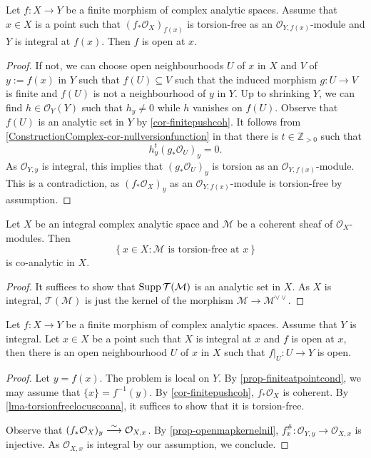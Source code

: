 \begin{corollary}
    Let $f:X\rightarrow Y$ be a finite morphism of complex analytic spaces. Assume that $x\in X$ is a point such that $(f_*\mathcal{O}_X)_{f(x)}$ is torsion-free as an $\mathcal{O}_{Y,f(x)}$-module and $Y$ is integral at $f(x)$. Then $f$ is open at $x$.
\end{corollary}
\begin{proof}
    If not, we can choose open neighbourhoods $U$ of $x$ in $X$ and $V$ of $y:=f(x)$ in $Y$ such that $f(U)\subseteq V$ such that the induced morphism $g:U\rightarrow V$ is finite and $f(U)$ is not a neighbourhood of $y$ in $Y$. 
    Up to shrinking $Y$, we can find $h\in \mathcal{O}_Y(Y)$ such that $h_y\neq 0$ while $h$ vanishes on $f(U)$. 
     Observe that $f(U)$ is an analytic set in $Y$ by  \cref{cor-finitepushcoh}. It follows from \cref{ConstructionComplex-cor-nullversionfunction} in  that there is $t\in \mathbb{Z}_{>0}$ such that
     \[
        h_y^t (g_*\mathcal{O}_U)_y=0.   
     \]
     As $\mathcal{O}_{Y,y}$ is integral, this implies that $(g_*\mathcal{O}_U)_y$ is torsion as an $\mathcal{O}_{Y,f(x)}$-module. This is a contradiction, as $(f_*\mathcal{O}_X)_y$ as an $\mathcal{O}_{Y,f(x)}$-module is torsion-free by assumption.
\end{proof} 

\begin{lemma}\label{lma-torsionfreelocuscoana}
    Let $X$ be an integral complex analytic space and $\mathcal{M}$ be a coherent sheaf of $\mathcal{O}_X$-modules. Then
    \[
        \left\{x\in X: \mathcal{M}\text{ is torsion-free at }x \right\}
    \]
    is co-analytic in $X$.
\end{lemma}
\begin{proof}
    It suffices to show that $\operatorname{Supp} \mathcal{T}(\mathcal{M})$ is an analytic set in $X$. As $X$ is integral, $\mathcal{T}(\mathcal{M})$ is just the kernel of the morphism $\mathcal{M}\rightarrow \mathcal{M}^{\vee\vee}$.
\end{proof}

\begin{corollary}
    Let $f:X\rightarrow Y$ be a finite morphism of complex analytic spaces. Assume that $Y$ is integral. Let $x\in X$ be a point such that $X$ is integral at $x$ and $f$ is open at $x$, then there is an open neighbourhood $U$ of $x$ in $X$ such that $f|_U:U\rightarrow Y$ is open.
\end{corollary}
\begin{proof}
    Let $y=f(x)$.
    The problem is local on $Y$.
    By \cref{prop-finiteatpointcond}, we may assume that $\{x\}=f^{-1}(y)$. By \cref{cor-finitepushcoh}, $f_*\mathcal{O}_X$ is coherent. By \cref{lma-torsionfreelocuscoana}, it suffices to show that it is torsion-free.
    
    Observe that $(f_*\mathcal{O}_{X})_y\stackrel{\sim}{\longrightarrow} \mathcal{O}_{X,x}$. By \cref{prop-openmapkernelnil}, $f^{\#}_x:\mathcal{O}_{Y,y}\rightarrow \mathcal{O}_{X,x}$ is injective. As $\mathcal{O}_{X,x}$ is integral by our assumption, we conclude.
\end{proof}

